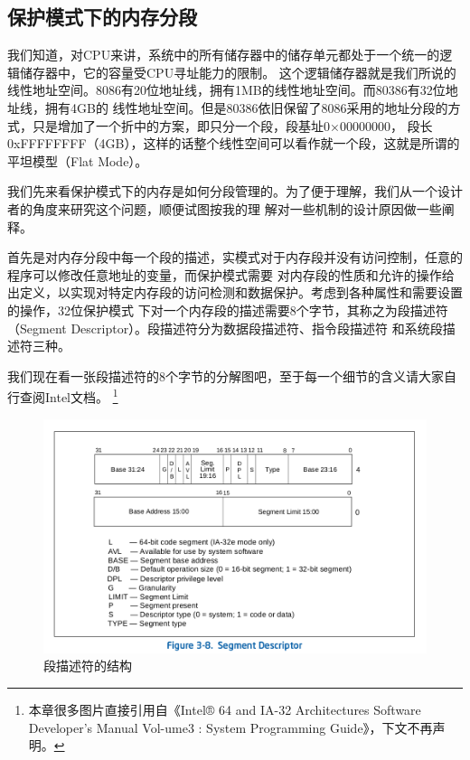 \subsection{保护模式下的内存分段}

\par 我们知道，对CPU来讲，系统中的所有储存器中的储存单元都处于一个统一的逻辑储存器中，它的容量受CPU寻址能力的限制。\allowbreak
这个逻辑储存器就是我们所说的线性地址空间。8086有20位地址线，拥有1MB的线性地址空间。而80386有32位地址线，拥有4GB的\allowbreak
线性地址空间。但是80386依旧保留了8086采用的地址分段的方式，只是增加了一个折中的方案，即只分一个段，段基址0×00000000，\allowbreak
段长0xFFFFFFFF（4GB），这样的话整个线性空间可以看作就一个段，这就是所谓的平坦模型（Flat Mode）。

\par  我们先来看保护模式下的内存是如何分段管理的。为了便于理解，我们从一个设计者的角度来研究这个问题，顺便试图按我的理\allowbreak
解对一些机制的设计原因做一些阐释。

\par 首先是对内存分段中每一个段的描述，实模式对于内存段并没有访问控制，任意的程序可以修改任意地址的变量，而保护模式需要\allowbreak
对内存段的性质和允许的操作给出定义，以实现对特定内存段的访问检测和数据保护。考虑到各种属性和需要设置的操作，32位保护模式\allowbreak
下对一个内存段的描述需要8个字节，其称之为段描述符（Segment Descriptor）。段描述符分为数据段描述符、指令段描述符\allowbreak
和系统段描述符三种。

\par 我们现在看一张段描述符的8个字节的分解图吧，至于每一个细节的含义请大家自行查阅Intel文档。\allowbreak
\footnote{本章很多图片直接引用自《Intel® 64 and IA-32 Architectures Software Developer’s Manual Vol-ume3 :
System Programming Guide》，下文不再声明。}

\begin{figure}[ht]
      \centering
      \includegraphics[scale=0.45]{picture/chapt6/segment_descriptor.png}
      \caption{段描述符的结构}
\end{figure}

